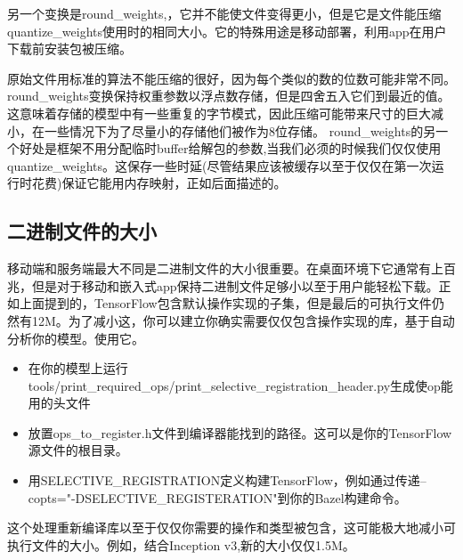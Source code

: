 另一个变换是round\_weights,，它并不能使文件变得更小，但是它是文件能压缩quantize\_weights使用时的相同大小。它的特殊用途是移动部署，利用app在用户下载前安装包被压缩。

原始文件用标准的算法不能压缩的很好，因为每个类似的数的位数可能非常不同。round\_weights变换保持权重参数以浮点数存储，但是四舍五入它们到最近的值。这意味着存储的模型中有一些重复的字节模式，因此压缩可能带来尺寸的巨大减小，在一些情况下为了尽量小的存储他们被作为8位存储。
round\_weights的另一个好处是框架不用分配临时buffer给解包的参数,当我们必须的时候我们仅仅使用quantize\_weights。这保存一些时延(尽管结果应该被缓存以至于仅仅在第一次运行时花费)保证它能用内存映射，正如后面描述的。
\subsection{二进制文件的大小}
移动端和服务端最大不同是二进制文件的大小很重要。在桌面环境下它通常有上百兆，但是对于移动和嵌入式app保持二进制文件足够小以至于用户能轻松下载。正如上面提到的，TensorFlow包含默认操作实现的子集，但是最后的可执行文件仍然有12M。为了减小这，你可以建立你确实需要仅仅包含操作实现的库，基于自动分析你的模型。使用它。
\begin{itemize}
\item 在你的模型上运行tools/print\_required\_ops/print\_selective\_registration\_header.py生成使op能用的头文件
\item 放置ops\_to\_register.h文件到编译器能找到的路径。这可以是你的TensorFlow源文件的根目录。
\item 用SELECTIVE\_REGISTRATION定义构建TensorFlow，例如通过传递--copts="-DSELECTIVE\_REGISTERATION"到你的Bazel构建命令。
\end{itemize}
这个处理重新编译库以至于仅仅你需要的操作和类型被包含，这可能极大地减小可执行文件的大小。例如，结合Inception v3,新的大小仅仅1.5M。
